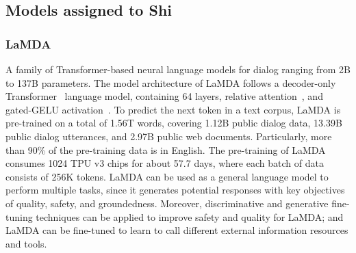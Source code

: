 \subsection{Models assigned to Shi}
\subsubsection{LaMDA~\cite{thoppilan2022lamda}}
A family of Transformer-based neural language models for dialog ranging from 2B to 137B parameters. The model architecture of LaMDA follows a decoder-only Transformer~\cite{Transformers} language model, containing 64 layers, relative attention~\cite{T5}, and gated-GELU activation~\cite{shazeer2020glu}. To predict the next token in a text corpus, LaMDA is pre-trained on a total of 1.56T words, covering 1.12B public dialog data, 13.39B public dialog utterances, and 2.97B public web documents.
Particularly, more than 90\% of the pre-training data is in English. The pre-training of LaMDA consumes 1024 TPU v3 chips for about 57.7 days, where each batch of data consists of 256K tokens. LaMDA can be used as a general language model to perform multiple tasks, since it generates potential responses with key objectives of quality, safety, and groundedness. Moreover, discriminative and generative fine-tuning techniques can be applied to improve safety and quality for LaMDA; and LaMDA can be fine-tuned to learn to call different external information resources and tools.
